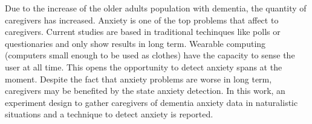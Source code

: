 Due to the increase of the older adults population with dementia, the quantity of caregivers has increased. Anxiety is one of the top problems that affect to caregivers. Current studies are based in traditional techinques like polls or questionaries and only show results in long term. Wearable computing (computers small enough to be used as clothes) have the capacity to sense the user at all time. This opens the opportunity to detect anxiety spans at the moment. Despite the fact that anxiety problems are worse in long term, caregivers may be benefited by the state anxiety detection. In this work, an experiment design to gather caregivers of dementia anxiety data  in naturalistic situations and a technique to detect anxiety is reported.

